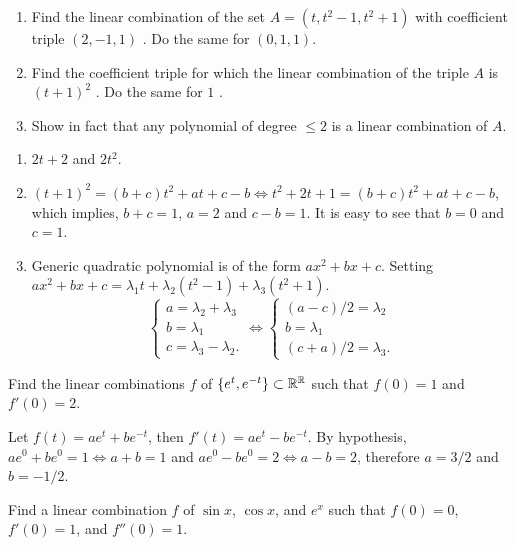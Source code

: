 \documentclass[../../main.tex]{subfiles}
\begin{document}
\begin{problem}
	\begin{enumerate}[label = (\alph*)]
		\item Find the linear combination of the set  $A = (t,t^2-1,t^2+1)$ with coefficient triple  $(2,-1,1)$    . Do the same for  $(0,1,1)$.  	
		\item Find the coefficient triple for which the linear combination of the triple  $A$  is  $(t+1)^2$  . Do the same for  $1$  .
		\item Show in fact that any polynomial of degree  $\leq 2$ is a linear combination of $A$.  
	\end{enumerate}
\end{problem}
\begin{solution}
\begin{enumerate}[label = (\alph*)]
	\item
		$2t +2$ and $2t^2$.
	\item
		$(t+1)^2 = (b+c)t^2+ at + c-b \Leftrightarrow t^2+2t+1 = (b+c)t^2 + at + c-b$, which implies, $b+c=1$, $a=2$ and $c-b=1$. It is easy to see that $b=0$ and $c=1$.
	\item
		Generic quadratic polynomial is of the form $ax^2 + bx + c$. Setting $ax^2+bx+c = \lambda_1 t + \lambda_2 (t^2-1) + \lambda_3(t^2+1)$.
		\[	
		\begin{cases}
			a = \lambda_2 + \lambda_3 \\
			b = \lambda_1 \\
			c = \lambda_3 - \lambda_2.
		\end{cases}
		\Leftrightarrow
		\begin{cases}
			(a-c)/2 = \lambda_2 \\
			b = \lambda_1 \\
			(c + a)/2 = \lambda_3.
		\end{cases}
		\]
		\end{enumerate}
\end{solution}
\begin{problem}
	Find the linear combinations  $f$  of $ \{e^t , e^{-t} \} \subset \mathbb{R}^{\mathbb{R}}$ such that  $f(0) = 1$ and  $f'(0)=2$.
\end{problem}
\begin{solution}
	Let $f(t) = ae^t+be^{-t}$, then $f'(t) = ae^t-be^{-t}$. By hypothesis, $ae^0+be^0 = 1 \Leftrightarrow a+b=1$ and $ae^0-be^0 = 2 \Leftrightarrow a-b=2$, therefore $a = 3/2$ and $b=-1/2$.
\end{solution}
\begin{problem}
	Find a linear combination  $f$  of  $\sin x$,  $\cos x$, and  $e^x$  such that  $f(0)=0$,  $f'(0) = 1$, and  $  f''(0) = 1$.	
\end{problem}
\end{document}
